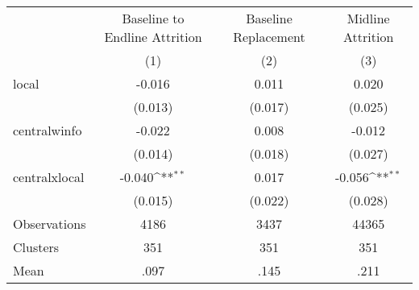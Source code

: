 {
\def\sym#1{\ifmmode^{#1}\else\(^{#1}\)\fi}
\begin{tabular}{l*{3}{c}}
\hline\hline
                &\multicolumn{1}{c}{Baseline to Endline Attrition}&\multicolumn{1}{c}{Baseline Replacement}&\multicolumn{1}{c}{Midline Attrition}\\
                &\multicolumn{1}{c}{(1)}         &\multicolumn{1}{c}{(2)}         &\multicolumn{1}{c}{(3)}         \\
\hline
local           &   -0.016         &    0.011         &    0.020         \\
                &  (0.013)         &  (0.017)         &  (0.025)         \\
centralwinfo    &   -0.022         &    0.008         &   -0.012         \\
                &  (0.014)         &  (0.018)         &  (0.027)         \\
centralxlocal   &   -0.040\sym{**} &    0.017         &   -0.056\sym{**} \\
                &  (0.015)         &  (0.022)         &  (0.028)         \\
\hline
Observations    &     4186         &     3437         &    44365         \\
Clusters        &      351         &      351         &      351         \\
Mean            &     .097         &     .145         &     .211         \\
\hline\hline
\end{tabular}
}
